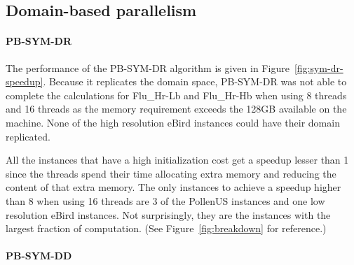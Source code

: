 \documentclass[10pt, conference, compsocconf]{IEEEtran}
\begin{document}
\subsection{Domain-based parallelism}

\paragraph{PB-SYM-DR}




The performance of the PB-SYM-DR algorithm is given in
Figure~\ref{fig:sym-dr-speedup}. Because it replicates the domain
space, PB-SYM-DR was not able to complete the calculations for
Flu\_Hr-Lb and Flu\_Hr-Hb when using 8 threads and 16 threads as the
memory requirement exceeds the 128GB available on the machine. None of
the high resolution eBird instances could have their domain
replicated.


All the instances that have a high initialization cost get a speedup
lesser than 1 since the threads spend their time allocating extra
memory and reducing the content of that extra memory. The only
instances to achieve a speedup higher than 8 when using 16 threads are 3 of 
the PollenUS instances and one low resolution eBird instances. Not
surprisingly, they are the instances with the largest fraction of
computation. (See Figure~\ref{fig:breakdown} for reference.)



\paragraph{PB-SYM-DD}

\end{document}
